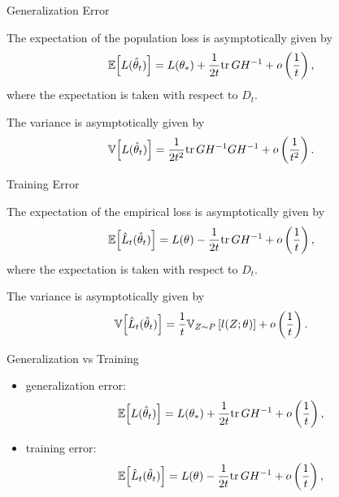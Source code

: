 \documentclass[fleqn,aspectratio=1610]{beamer}
\begin{document}
\begin{frame}[label={sec:orgd98a009}]{Generalization Error}
\begin{theorem}[]\label{sec:org378cb83}
The expectation of the population loss is asymptotically given by
\begin{equation}
  \mathbb{E}\Bigl[L(\hat\theta_{t})\Bigr]
  =L(\theta_*)
  +\frac{1}{2t}\mathrm{tr}\, GH^{-1}
  +o\left(\frac{1}{t}\right),
\end{equation}
where the expectation is taken with respect to \(D_{t}\).

The variance is asymptotically given by
\begin{equation}
  \mathbb{V}\Bigl[L(\hat\theta_{t})\Bigr]
  =\frac{1}{2t^2}\mathrm{tr}\, GH^{-1}GH^{-1}
  +o\left(\frac{1}{t^2}\right).
\end{equation}
\end{theorem}
\end{frame}

\begin{frame}[label={sec:orge7831c1}]{Training Error}
\begin{theorem}[]\label{sec:org33c3c0c}
The expectation of the empirical loss is asymptotically given by
\begin{equation}
  \mathbb{E}\Bigl[\hat{L}_{t}(\hat\theta_{t})\Bigr]
  =L(\theta_{})
  -\frac{1}{2t}\mathrm{tr}\, GH^{-1}
  +o\left(\frac{1}{t}\right),
\end{equation}
where the expectation is taken with respect to \(D_{t}\).

The variance is asymptotically given by
\begin{equation}
  \mathbb{V}\Bigl[\hat{L}_{t}(\hat\theta_{t})\Bigr]
  =\frac{1}{t}\mathbb{V}_{Z\sim P}\left[l(Z;\theta_{})\right]
  +o\left(\frac{1}{t}\right).
\end{equation}
\end{theorem}
\end{frame}

\begin{frame}[label={sec:orge5b5bd8}]{Generalization vs Training}
\begin{itemize}
\item generalization error:
\begin{equation}
  \mathbb{E}\Bigl[L(\hat\theta_{t})\Bigr]
  =L(\theta_*)
  +\frac{1}{2t}\mathrm{tr}\, GH^{-1}
  +o\left(\frac{1}{t}\right),
\end{equation}
\item training error:
\begin{equation}
  \mathbb{E}\Bigl[\hat{L}_{t}(\hat\theta_{t})\Bigr]
  =L(\theta_{})
  -\frac{1}{2t}\mathrm{tr}\, GH^{-1}
  +o\left(\frac{1}{t}\right),
\end{equation}
\end{itemize}
\end{frame}
\end{document}
